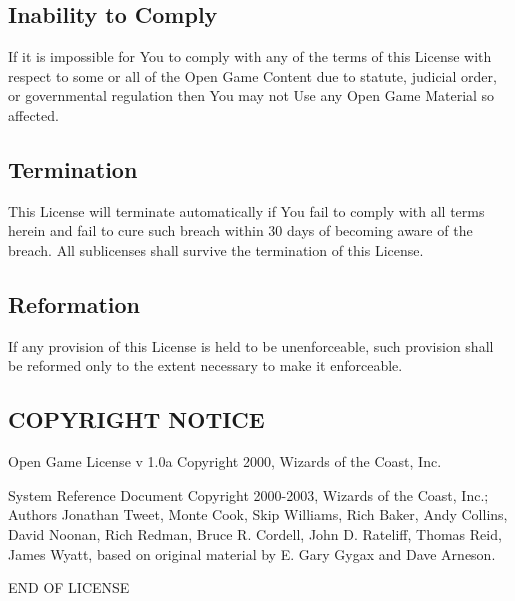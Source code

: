 \subsection{Inability to Comply}

If it is impossible for You to comply with any of the 
terms of this License with respect to some or all of the Open Game Content due 
to statute, judicial order, or governmental regulation then You may not Use any 
Open Game Material so affected. 


\subsection{Termination}

This License will terminate automatically if You fail to comply 
with all terms herein and fail to cure such breach within 30 days of becoming aware 
of the breach. All sublicenses shall survive the termination of this License. 


\subsection{Reformation}

If any provision of this License is held to be unenforceable, 
such provision shall be reformed only to the extent necessary to make it enforceable. 


\subsection{COPYRIGHT NOTICE}

Open Game License v 1.0a Copyright 2000, Wizards of the Coast, Inc. 


System Reference Document Copyright 2000-2003, Wizards of the Coast, Inc.; Authors 
Jonathan Tweet, Monte Cook, Skip Williams, Rich Baker, Andy Collins, David Noonan, 
Rich Redman, Bruce R. Cordell, John D. Rateliff, Thomas Reid, James Wyatt, based 
on original material by E. Gary Gygax and Dave Arneson. 

\vspace{1cm}

\begin{center}
END OF LICENSE
\end{center}

\newpage

